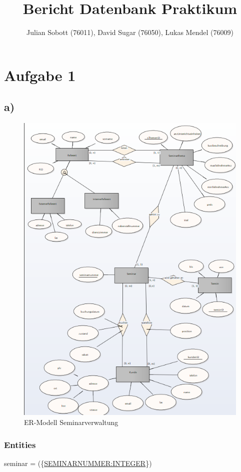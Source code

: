 \documentclass[10pt,a4paper]{report}
\author{Julian Sobott (76011), David Sugar (76050), Lukas Mendel (76009)}
\title{Bericht Datenbank Praktikum}
\begin{document}
\maketitle
\tableofcontents

\newpage
\section{Aufgabe 1}
\subsection{a)}
\begin{figure}[h]
	\includegraphics[scale=0.7]{Bilder/ER-Modell.PNG}
	\caption{ER-Modell Seminarverwaltung}
	\label{er:1}
\end{figure}

\subsubsection{Entities}
seminar = (\{\underline{SEMINARNUMMER:INTEGER}\})
\end{document}
